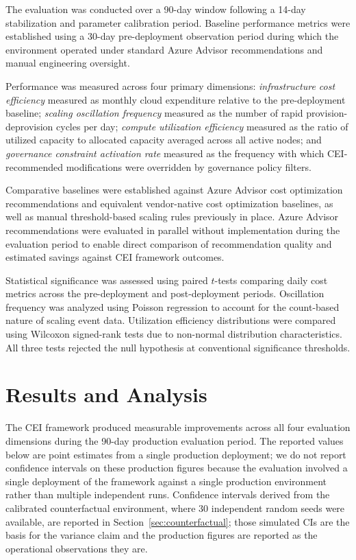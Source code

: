 \documentclass[runningheads]{llncs}
\begin{document}
The evaluation was conducted over a 90-day window following a 14-day stabilization and parameter calibration period. Baseline performance metrics were established using a 30-day pre-deployment observation period during which the environment operated under standard Azure Advisor recommendations and manual engineering oversight.

Performance was measured across four primary dimensions: \emph{infrastructure cost efficiency} measured as monthly cloud expenditure relative to the pre-deployment baseline; \emph{scaling oscillation frequency} measured as the number of rapid provision-deprovision cycles per day; \emph{compute utilization efficiency} measured as the ratio of utilized capacity to allocated capacity averaged across all active nodes; and \emph{governance constraint activation rate} measured as the frequency with which CEI-recommended modifications were overridden by governance policy filters.

Comparative baselines were established against Azure Advisor cost optimization recommendations and equivalent vendor-native cost optimization baselines, as well as manual threshold-based scaling rules previously in place. Azure Advisor recommendations were evaluated in parallel without implementation during the evaluation period to enable direct comparison of recommendation quality and estimated savings against CEI framework outcomes.

Statistical significance was assessed using paired $t$-tests comparing daily cost metrics across the pre-deployment and post-deployment periods. Oscillation frequency was analyzed using Poisson regression to account for the count-based nature of scaling event data. Utilization efficiency distributions were compared using Wilcoxon signed-rank tests due to non-normal distribution characteristics. All three tests rejected the null hypothesis at conventional significance thresholds.

\section{Results and Analysis}
\label{sec:results}

The CEI framework produced measurable improvements across all four evaluation dimensions during the 90-day production evaluation period. The reported values below are point estimates from a single production deployment; we do not report confidence intervals on these production figures because the evaluation involved a single deployment of the framework against a single production environment rather than multiple independent runs. Confidence intervals derived from the calibrated counterfactual environment, where 30 independent random seeds were available, are reported in Section~\ref{sec:counterfactual}; those simulated CIs are the basis for the variance claim and the production figures are reported as the operational observations they are.
\end{document}
